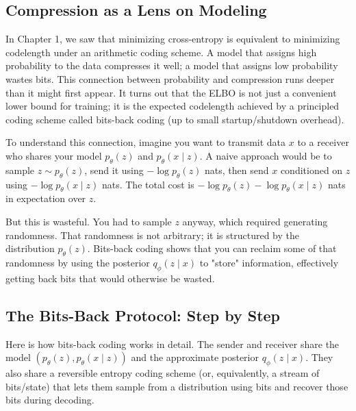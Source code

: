 \vspace{1em}

\subsection{Compression as a Lens on Modeling}

In Chapter 1, we saw that minimizing cross-entropy is equivalent to minimizing codelength under an arithmetic coding scheme. A model that assigns high probability to the data compresses it well; a model that assigns low probability wastes bits. This connection between probability and compression runs deeper than it might first appear. It turns out that the ELBO is not just a convenient lower bound for training; it is the expected codelength achieved by a principled coding scheme called bits-back coding (up to small startup/shutdown overhead).

\vspace{0.3cm}

To understand this connection, imagine you want to transmit data $x$ to a receiver who shares your model $p_\theta(z)$ and $p_\theta(x \mid z)$. A naive approach would be to sample $z \sim p_\theta(z)$, send it using $-\log p_\theta(z)$ nats, then send $x$ conditioned on $z$ using $-\log p_\theta(x \mid z)$ nats. The total cost is $-\log p_\theta(z) - \log p_\theta(x \mid z)$ nats in expectation over $z$.

\vspace{0.3cm}

But this is wasteful. You had to sample $z$ anyway, which required generating randomness. That randomness is not arbitrary; it is structured by the distribution $p_\theta(z)$. Bits-back coding shows that you can reclaim some of that randomness by using the posterior $q_\phi(z \mid x)$ to "store" information, effectively getting back bits that would otherwise be wasted.

\vspace{1.5em}

\subsection{The Bits-Back Protocol: Step by Step}

Here is how bits-back coding works in detail. The sender and receiver share the model $(p_\theta(z), p_\theta(x \mid z))$ and the approximate posterior $q_\phi(z \mid x)$. They also share a reversible entropy coding scheme (or, equivalently, a stream of bits/state) that lets them sample from a distribution using bits and recover those bits during decoding.

